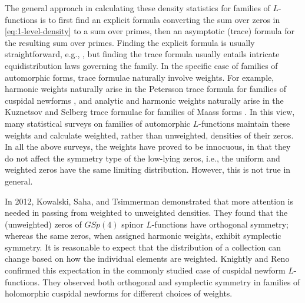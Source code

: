 \documentclass[12pt, reqno,oneside]{amsart}
\theoremstyle{plain}
\theoremstyle{definition}
\theoremstyle{remark}
\theoremstyle{plain}
\numberwithin{equation}{section}
\begin{document}
The general approach in calculating these density statistics for families of $L$-functions is to first find an explicit formula converting the sum over zeros in \eqref{eq:1-level-density} to a sum over primes, then an asymptotic (trace) formula for the resulting sum over primes. Finding the explicit formula is usually straightforward, e.g., \cite[Lemma 4.1]{ILS00}, but finding the trace formula usually entails intricate equidistribution laws governing the family. In the specific case of families of automorphic forms, trace formulae naturally involve weights. For example, harmonic weights naturally arise in the Petersson trace formula for families of cuspidal newforms \cite[(2.53)]{ILS00}, and analytic and harmonic weights naturally arise in the Kuznetsov and Selberg trace formulae for families of Maass forms \cite[Remark 1.6]{KL13, GK12}. In this view, many statistical surveys on families of automorphic $L$-functions \cite{Alp+15, GK12, ILS00} maintain these weights and calculate weighted, rather than unweighted, densities of their zeros. In all the above surveys, the weights have proved to be innocuous, in that they do not affect the symmetry type of the low-lying zeros, i.e., the uniform and weighted zeros have the same limiting distribution. However, this is not true in general. 

In 2012, Kowalski, Saha, and Tsimmerman \cite{KST12} demonstrated that more attention is needed in passing from weighted to unweighted densities. They found that the (unweighted) zeros of $GSp(4)$ spinor $L$-functions have orthogonal symmetry; whereas the same zeros, when assigned harmonic weights, exhibit symplectic symmetry. It is reasonable to expect that the distribution of a collection can change based on how the individual elements are weighted. Knightly and Reno \cite{KR18} confirmed this expectation in the commonly studied case of cuspidal newform $L$-functions. They observed both orthogonal and symplectic symmetry in families of holomorphic cuspidal newforms for different choices of weights. 
\end{document}
